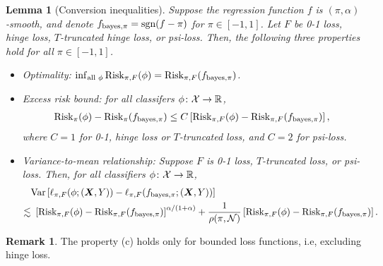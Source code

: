 \documentclass[11pt]{article}
\theoremstyle{plain}
\newtheorem{lem}{Lemma}
\theoremstyle{definition}
\newtheorem{rmk}{Remark}
\def\sign{\textup{sgn}}
\def\bayespif{f_{\textup{bayes},\pi}}
\def\risk{\textup{Risk}_\pi}
\def\riskF{\textup{Risk}_{\pi,F}}
\begin{document}
\begin{lem}[Conversion inequalities]\label{lem:prepare} Suppose the regression function $f$ is $(\pi,\alpha)$-smooth, and denote $\bayespif=\sign(f-\pi)$ for $\pi\in[-1,1]$. Let $F$ be 0-1 loss, hinge loss, $T$-truncated hinge loss, or psi-loss. Then, the following three properties hold for all $\pi\in[-1,1]$.
\begin{itemize}[label={2.\arabic*},wide, labelwidth=!, labelindent=0pt]
\item[(a)] Optimality: $\inf_{\text{all }\phi}\riskF(\phi)=\riskF(\bayespif)$.
\item[(b)] Excess risk bound: for all classifers $\phi\colon \mathcal{X}\to\mathbb{R}$,
\begin{align}\label{eq:b1}
\risk(\phi)-\risk(\bayespif) \leq  C\left[\riskF(\phi)-\riskF(\bayespif)\right],
\end{align}
where $C=1$ for 0-1, hinge loss or $T$-truncated loss, and $C=2$ for psi-loss. 
\item[(c)] Variance-to-mean relationship: Suppose $F$ is 0-1 loss, $T$-truncated loss, or psi-loss. Then, for all classifiers $\phi\colon \mathcal{X}\to\mathbb{R}$, 
\begin{align}\label{eq:b2}
&\textup{Var}\left[\ell_{\pi,F}(\phi; (\mX,Y))-\ell_{\pi,F}(\bayespif; (\mX,Y))\right]  \notag \\
\lesssim &\ 
\left[\riskF(\phi)-\riskF(\bayespif)\right]^{\alpha/(1+\alpha)}+ {1\over \rho(\pi, \tN)}\left[\riskF(\phi)-\riskF(\bayespif)\right].
 \end{align}
 \end{itemize}
\end{lem}
\begin{rmk}
The property (c) holds only for bounded loss functions, i.e, excluding hinge loss. 
\end{rmk}
\end{document}
